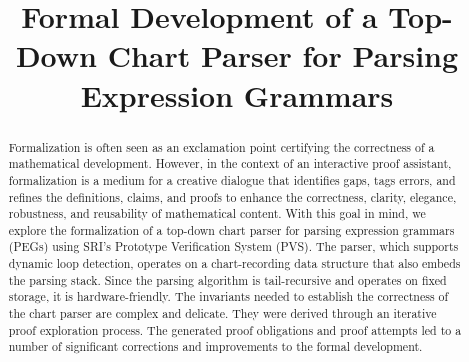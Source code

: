 \documentclass[letterpaper,conference,compsoc]{IEEEtran}
\begin{document}
\title{Formal Development of a Top-Down Chart Parser for Parsing Expression Grammars}
\author{  
  \and
}

\maketitle


\begin{abstract}
  Formalization is often seen as an exclamation point 
   certifying the correctness of a mathematical development.  However, in
  the context of an interactive proof assistant, formalization is a medium for a
  creative dialogue that identifies gaps, tags errors, and refines the
  definitions, claims, and proofs to enhance the correctness, clarity,
  elegance, robustness,
  and reusability of mathematical content.  With this goal in
  mind, we explore the formalization of a top-down chart parser for
  parsing expression grammars (PEGs) using SRI's Prototype
  Verification System (PVS).  The parser, which supports dynamic loop
  detection, operates on a chart-recording data structure that also embeds the
  parsing stack.  Since the parsing algorithm is tail-recursive and
  operates on fixed storage, it is hardware-friendly.  The invariants
  needed to establish the correctness of the chart parser are complex
  and delicate.  They were derived through an iterative proof
  exploration process.  The generated proof obligations and proof
  attempts led to a number of significant corrections and improvements
  to the formal development.
\end{abstract}




\end{document}

